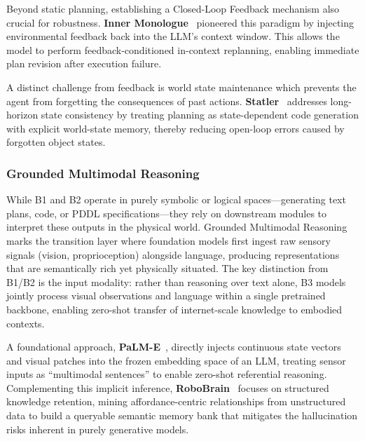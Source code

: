 \documentclass[acmsmall,screen,review,anonymous]{acmart}
\begin{document}
Beyond static planning, establishing a Closed-Loop Feedback mechanism also crucial for robustness. \textbf{Inner Monologue}~\cite{huang2023inner} pioneered this paradigm by injecting environmental feedback back into the LLM's context window. This allows the model to perform feedback-conditioned in-context replanning, enabling immediate plan revision after execution failure.

A distinct challenge from feedback is world state maintenance which prevents the agent from forgetting the consequences of past actions. \textbf{Statler}~\cite{yoneda2024statler} addresses long-horizon state consistency by treating planning as state-dependent code generation with explicit world-state memory, thereby reducing open-loop errors caused by forgotten object states.

\subsubsection{Grounded Multimodal Reasoning}\label{sec:multimodal_reasoning}

While B1 and B2 operate in purely symbolic or logical spaces---generating text plans, code, or PDDL specifications---they rely on downstream modules to interpret these outputs in the physical world. Grounded Multimodal Reasoning marks the transition layer where foundation models first ingest raw sensory signals (vision, proprioception) alongside language, producing representations that are semantically rich yet physically situated. The key distinction from B1/B2 is the input modality: rather than reasoning over text alone, B3 models jointly process visual observations and language within a single pretrained backbone, enabling zero-shot transfer of internet-scale knowledge to embodied contexts.

A foundational approach, \textbf{PaLM-E}~\cite{driess2023palme}, directly injects continuous state vectors and visual patches into the frozen embedding space of an LLM, treating sensor inputs as ``multimodal sentences'' to enable zero-shot referential reasoning. Complementing this implicit inference, \textbf{RoboBrain}~\cite{ji2025robobrain} focuses on structured knowledge retention, mining affordance-centric relationships from unstructured data to build a queryable semantic memory bank that mitigates the hallucination risks inherent in purely generative models.
\end{document}
